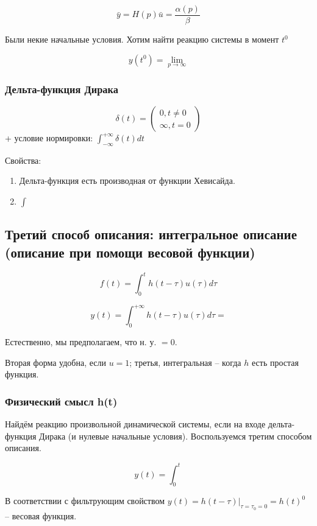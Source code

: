\documentclass[main.tex]{subfiles}
\begin{document}
$$ \bar y = H(p) \bar u = \frac{\alpha(p)}{\beta} $$

Были некие начальные условия.
Хотим найти реакцию системы в момент $t^0$

$$ y(t^0) = \lim_{p \to \infty} $$ %

\subsubsection{ Дельта-функция Дирака }

$$ \delta(t) = \begin{pmatrix}
	0, t \ne 0 \\
	\infty, t = 0
 \end{pmatrix} $$
+ условие нормировки: $ \int_{- \infty}^{+ \infty} \delta(t) dt $

Свойства:


\begin{enumerate}[noitemsep]
	\item Дельта-функция есть производная от функции Хевисайда.
	\item $ \int $ %
\end{enumerate}

\subsection{Третий способ описания: интегральное описание (описание при помощи весовой функции)}

$$ f(t) = \int_0^t h(t - \tau) u(\tau) d \tau $$


$$ y(t) = \int_{0}^{+ \infty}h(t - \tau)u(\tau) d\tau =  $$

Естественно, мы предполагаем, что н. у. $ =0 $.

Вторая форма удобна, если $ u = 1 $; третья, интегральная -- когда $ h $ есть простая функция.

\subsubsection{Физический смысл h(t)}

Найдём реакцию произвольной динамической системы, если на входе дельта-функция Дирака (и нулевые начальные условия).
Воспользуемся третим способом описания.

$$ y(t) = \int_0^t  $$

В соответствии с фильтрующим свойством $ y(t) = h(t-\tau)|_{\tau=\tau_0=0}=h(t)^0 $ -- весовая функция.
\end{document}
